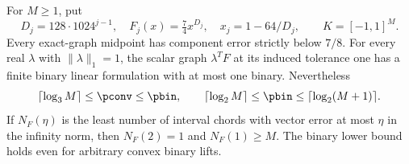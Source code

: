 \begin{proposition}\label{prop:vector-power-obstruction}
For $M\ge1$, put
\[
 D_j=128\cdot1024^{j-1},\quad F_j(x)=\tfrac74x^{D_j},
 \quad x_j=1-64/D_j,\qquad K=[-1,1]^M.
\]
Every exact-graph midpoint has component error strictly below $7/8$.
For every real $\lambda$ with $\|\lambda\|_1=1$, the scalar graph
$\lambda^TF$ at its induced tolerance one has a finite binary linear
formulation with at most one binary. Nevertheless
\begin{equation}\label{eq:power-vector-counts}
 \lceil\log_3M\rceil\le\pconv\le\pbin,
 \qquad
 \lceil\log_2M\rceil\le\pbin\le\lceil\log_2(M+1)\rceil.
\end{equation}
If $N_F(\eta)$ is the least number of interval chords with vector error
at most $\eta$ in the infinity norm, then $N_F(2)=1$ and $N_F(1)\ge M$.
The binary lower bound holds even for arbitrary convex binary lifts.
\end{proposition}
